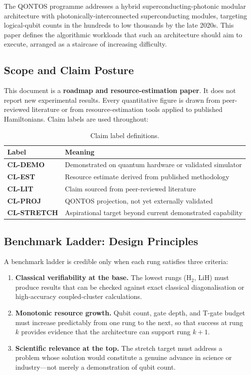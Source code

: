 \documentclass[conference]{IEEEtran}
\begin{document}
The QONTOS programme addresses a hybrid superconducting-photonic modular architecture
with photonically-interconnected superconducting modules, targeting logical-qubit counts
in the hundreds to low thousands by the late 2020s.
This paper defines the algorithmic workloads that such an architecture should aim to
execute, arranged as a staircase of increasing difficulty.

\subsection{Scope and Claim Posture}

This document is a \textbf{roadmap and resource-estimation paper}. It does not report new
experimental results. Every quantitative figure is drawn from peer-reviewed literature
or from resource-estimation tools applied to published Hamiltonians. Claim labels are
used throughout:

\begin{table}[H]
\centering
\caption{Claim label definitions.}
\begin{tabular}{@{}l l@{}}
\toprule
\textbf{Label} & \textbf{Meaning} \\
\midrule
\textbf{CL-DEMO} & Demonstrated on quantum hardware or validated simulator \\
\textbf{CL-EST} & Resource estimate derived from published methodology \\
\textbf{CL-LIT} & Claim sourced from peer-reviewed literature \\
\textbf{CL-PROJ} & QONTOS projection, not yet externally validated \\
\textbf{CL-STRETCH} & Aspirational target beyond current demonstrated capability \\
\bottomrule
\end{tabular}
\end{table}

\subsection{Benchmark Ladder: Design Principles}

A benchmark ladder is credible only when each rung satisfies three criteria:

\begin{enumerate}[leftmargin=*]
\item \textbf{Classical verifiability at the base.} The lowest rungs (H$_2$, LiH) must produce
   results that can be checked against exact classical diagonalisation or high-accuracy
   coupled-cluster calculations.
\item \textbf{Monotonic resource growth.} Qubit count, gate depth, and T-gate budget must
   increase predictably from one rung to the next, so that success at rung $k$ provides
   evidence that the architecture can support rung $k{+}1$.
\item \textbf{Scientific relevance at the top.} The stretch target must address a problem whose
   solution would constitute a genuine advance in science or industry---not merely a
   demonstration of qubit count.
\end{enumerate}
\end{document}
